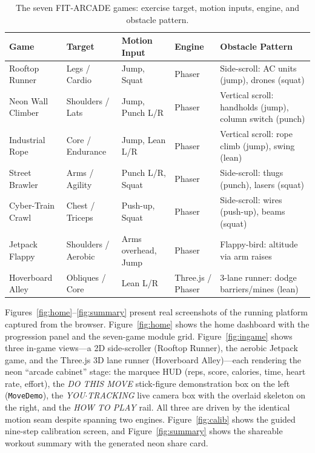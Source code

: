 \documentclass[runningheads]{llncs}
\newcommand{\sys}{\textsc{FIT-ARCADE}}
\begin{document}
\begin{table}[htbp]
\centering
\caption{The seven \sys{} games: exercise target, motion inputs, engine, and obstacle pattern.}
\label{tab:games}
\footnotesize
\begin{tabularx}{\textwidth}{@{}L{2.2cm}L{1.8cm}L{2.8cm}L{1.3cm}L{3.0cm}@{}}
\toprule
\textbf{Game} & \textbf{Target} & \textbf{Motion Input} & \textbf{Engine} & \textbf{Obstacle Pattern} \\
\midrule
Rooftop Runner & Legs / Cardio & Jump, Squat & Phaser & Side-scroll: AC units (jump), drones (squat) \\
\addlinespace
Neon Wall Climber & Shoulders / Lats & Jump, Punch L/R & Phaser & Vertical scroll: handholds (jump), column switch (punch) \\
\addlinespace
Industrial Rope & Core / Endurance & Jump, Lean L/R & Phaser & Vertical scroll: rope climb (jump), swing (lean) \\
\addlinespace
Street Brawler & Arms / Agility & Punch L/R, Squat & Phaser & Side-scroll: thugs (punch), lasers (squat) \\
\addlinespace
Cyber-Train Crawl & Chest / Triceps & Push-up, Squat & Phaser & Side-scroll: wires (push-up), beams (squat) \\
\addlinespace
Jetpack Flappy & Shoulders / Aerobic & Arms overhead, Jump & Phaser & Flappy-bird: altitude via arm raises \\
\addlinespace
Hoverboard Alley & Obliques / Core & Lean L/R & Three.js / Phaser & 3-lane runner: dodge barriers/mines (lean) \\
\bottomrule
\end{tabularx}
\end{table}

Figures~\ref{fig:home}--\ref{fig:summary} present real screenshots of the
running platform captured from the browser. Figure~\ref{fig:home} shows the
home dashboard with the progression panel and the seven-game module grid.
Figure~\ref{fig:ingame} shows three in-game views---a 2D side-scroller
(Rooftop Runner), the aerobic Jetpack game, and the Three.js 3D lane runner
(Hoverboard Alley)---each rendering the neon ``arcade cabinet'' stage: the
marquee HUD (reps, score, calories, time, heart rate, effort), the
\emph{DO THIS MOVE} stick-figure demonstration box on the left
(\texttt{MoveDemo}), the \emph{YOU$\cdot$TRACKING} live camera box with the
overlaid skeleton on the right, and the \emph{HOW TO PLAY} rail. All three
are driven by the identical motion seam despite spanning two engines.
Figure~\ref{fig:calib} shows the guided nine-step calibration screen, and
Figure~\ref{fig:summary} shows the shareable workout summary with the
generated neon share card.
\end{document}
